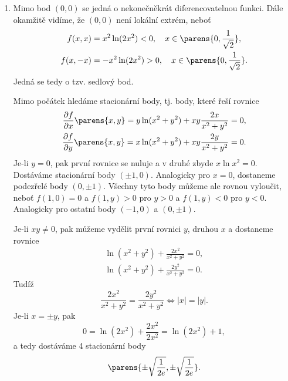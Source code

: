 \documentclass[answers]{exam}
\begin{document}
\begin{questions}
\begin{solution}
\begin{enumerate}[label=(\roman*)]
			\item 
				
				Mimo bod $(0,0)$ se jedn\'a o nekone\v cn\v ekr\'at diferencovatelnou funkci. D\'ale okam\v zit\v e vid\'ime, \v ze $(0,0)$ nen\'i lok\'aln\'i extr\'em, nebo\v t
				\begin{align*}
				f(x,x)&=x^2\ln(2x^2)<0,\quad x\in\parens{0,\frac{1}{\sqrt2}},\\
				f(x,-x)&=-x^2\ln(2x^2)>0,\quad x\in\parens{0,\frac{1}{\sqrt2}}.
				\end{align*}
				Jedn\'a se tedy o tzv. sedlov\'y bod.
				
				Mimo po\v c\'atek hledáme stacionární body, tj. body, které řeší rovnice
				\begin{align*}
				\frac{\partial f}{\partial x} \parens{x, y}= y\ln(x^2+y^2)+xy\frac{2x}{x^2+y^2}=0,\\
				\frac{\partial f}{\partial y} \parens{x, y}= x\ln(x^2+y^2)+xy\frac{2y}{x^2+y^2}=0.
				\end{align*}
				Je-li $y=0$, pak prvn\'i rovnice se nuluje a v druh\'e zbyde $x\ln x^2=0.$ Dostáváme  stacionární body $(\pm1,0)$. Analogicky pro $x=0$, dostaneme podez\v rel\'e body $(0,\pm1)$. Všechny tyto body m\r u\v zeme ale rovnou vylou\v cit, nebo\v t  $f(1,0)=0$ a $f(1,y)>0$ pro $y>0$ a $f(1,y)<0$ pro $y<0$. Analogicky pro ostatn\'i body $(-1,0)$ a $(0,\pm1)$.
				
				Je-li $xy\ne0$, pak m\r u\v zeme vyd\v elit prvn\'i rovnici $y$, druhou $x$ a dostaneme rovnice
				\begin{align*}
				 \ln(x^2+y^2)+\frac{2x^2}{x^2+y^2}=0,\\
				 \ln(x^2+y^2)+\frac{2y^2}{x^2+y^2}=0.
				\end{align*}
				Tud\'i\v z 
				$$\frac{2x^2}{x^2+y^2}=\frac{2y^2}{x^2+y^2}\Leftrightarrow|x|=|y|.$$
				Je-li $x=\pm y$, pak
				$$0= \ln(2x^2)+\frac{2x^2}{2x^2}=\ln (2x^2)+1,$$
				a tedy dost\'av\'ame 4 stacionární body
				$$\parens{\pm\sqrt{\frac{1}{2e}},\pm\sqrt{\frac{1}{2e}}}.$$
				

\end{enumerate}
\end{solution}
\end{questions}
\end{document}
